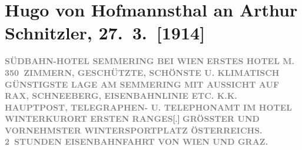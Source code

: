 

         
         \renewcommand{\erwaehntePersonen}{Personen: Rudolf Holzer}
         \renewcommand{\erwaehnteInstitutionen}{Institutionen: Raimund-Preis, Südbahnstrecke}
         \renewcommand{\erwaehnteOrte}{Orte: Graz, Niederösterreich, Oberösterreich, Rax, Rodaun, Schneeberg, Semmering, Südbahnhotel, Wien, Österreich}
         \renewcommand{\erwaehnteWerke}{Werke: Der junge Medardus. Dramatische Historie in einem Vorspiel und fünf Aufzügen, Gute Mütter. Komödie in drei Akten}
               \section[Hugo von Hofmannsthal an Arthur Schnitzler, 27. 3. {[}1914{]}]{ Hugo von Hofmannsthal an Arthur Schnitzler, 27. 3. {[}1914{]}}\nopagebreak{}\rehead{ }\begin{ledgroupsized}[t]{13cm}\normalsize\beginnumbering \toendnotes[C]{\smallbreak\pagebreak[2]} 
\toendnotes[C]{\smallbreak}\pstart
           \noindent{}\centering{}{\pb}\textcolor{gray}{\textbf{SÜDBAHN-HOTEL SEMMERING BEI WIEN}}\pend
           \pstart
           \noindent{}\textcolor{gray}{\textbf{ERSTES HOTEL M. 350 ZIMMERN, GESCHÜTZTE, SCHÖNSTE U.
                        KLIMATISCH GÜNSTIGSTE LAGE AM SEMMERING
                        MIT AUSSICHT AUF RAX, SCHNEEBERG, EISENBAHNLINIE ETC. K.K. HAUPTPOST, TELEGRAPHEN-
                        U. TELEPHONAMT IM HOTEL}}\pend
           \pstart
           \textcolor{gray}{\textbf{WINTERKURORT ERSTEN RANGES}}{[}.{]}{ }\textcolor{gray}{\textbf{GRÖSSTER UND VORNEHMSTER WINTERSPORTPLATZ ÖSTERREICHS. 2 STUNDEN EISENBAHNFAHRT VON WIEN UND GRAZ.}}\pend

\end{ledgroupsized}
